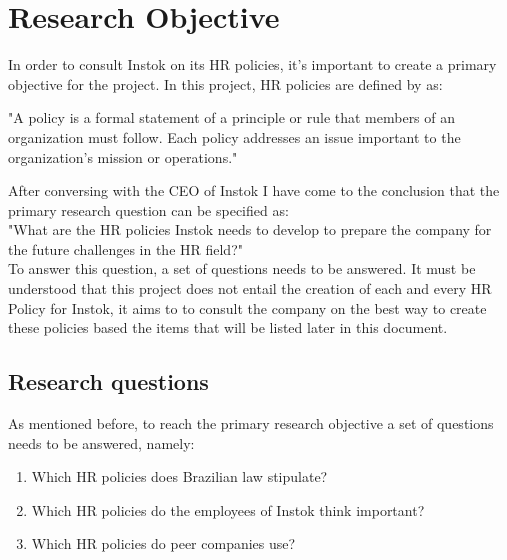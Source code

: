 \documentclass[man]{apa6}
\begin{document}
\section{Research Objective}
In order to consult Instok on its HR policies, it's important to create a primary objective for the project. In this project, HR policies are defined by \cite{HRCA2016} as: \\

\begin{displayquote}
"A policy is a formal statement of a principle or rule that members of an organization must follow. Each policy addresses an issue important to the organization's mission or operations."
\end{displayquote}

After conversing with the CEO of Instok I have come to the conclusion that the primary research question can be specified as:\\
"What are the HR policies Instok needs to develop to prepare the company for the future challenges in the HR field?"\\
To answer this question, a set of questions needs to be answered. It must be understood that this project does not entail the creation of each and every HR Policy for Instok, it aims to to consult the company on the best way to create these policies based the items that will be listed later in this document. 

\subsection{Research questions}
As mentioned before, to reach the primary research objective a set of questions needs to be answered, namely:
\begin{enumerate}
\item Which HR policies does Brazilian law stipulate?
\item Which HR policies do the employees of Instok think important?
\item Which HR policies do peer companies use?
\end{enumerate}
\end{document}

